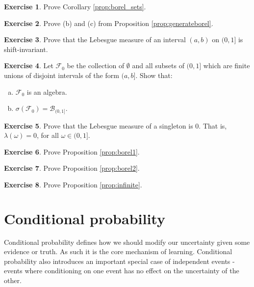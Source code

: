 \documentclass{book}
\theoremstyle{plain}%
\theoremstyle{definition}
\newtheorem{exercise}{Exercise}[chapter]
\begin{document}
\begin{exercise}
Prove Corollary \ref{prop:borel_sets}.
\end{exercise}

\begin{exercise}
Prove (b) and (c) from Proposition \ref{prop:generateborel}.
\end{exercise}

\begin{exercise}
Prove that the Lebesgue measure of an interval $(a,b)$ on $(0,1]$ is shift-invariant.
\end{exercise}

\begin{exercise}
Let $\mathcal{F}_0$ be the collection of $\emptyset$ and all subsets of $(0,1]$ which are finite unions of disjoint intervals of the form $(a, b]$. Show that:

\begin{enumerate}[(a)]
\item $\mathcal{F}_0$ is an algebra.
\item $\sigma(\mathcal{F}_0) = \mathcal{B}_{(0,1]}$.
\end{enumerate}
\end{exercise}

\begin{exercise}
Prove that the Lebesgue measure of a singleton is 0. That is, $\lambda(\omega) = 0$, for all $\omega \in (0,1]$.
\end{exercise}

\begin{exercise}
Prove Proposition \ref{prop:borel1}.
\end{exercise}

\begin{exercise}
Prove Proposition \ref{prop:borel2}.
\end{exercise}

\begin{exercise}
Prove Proposition \ref{prop:infinite}.
\end{exercise}

\chapter{Conditional probability}

Conditional probability defines how we should modify our uncertainty given some evidence or truth. As such it is the core mechanism of learning. Conditional probability also introduces an important special case of independent events - events where conditioning on one event has no effect on the uncertainty of the other.
\end{document}
